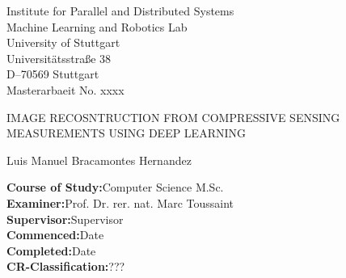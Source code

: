 \begin{titlepage}

\centering
\sffamily
%
\small
Institute for Parallel and Distributed Systems \\
Machine Learning and Robotics Lab\\
\null\vspace{0.5cm}
University of Stuttgart\\
Universitätsstraße 38\\
D–70569 Stuttgart\\

\null\vspace{1cm}
Masterarbaeit No. xxxx

\large
\null\vspace{1.5cm}
{\huge IMAGE RECOSNTRUCTION FROM COMPRESSIVE SENSING MEASUREMENTS USING DEEP LEARNING\\[12pt] 
} 
\null\vspace{0.2cm}

\small
Luis Manuel Bracamontes Hernandez

\raggedright
\null\vspace{1.5cm}
\textbf{Course of Study:}\null\hspace{0.1cm}Computer Science M.Sc.\\
\null\vspace{0.7cm}
\textbf{Examiner:}\null\hspace{0.1cm}Prof. Dr. rer. nat. Marc Toussaint\\
\null\vspace{0.01cm}
\textbf{Supervisor:}\null\hspace{0.1cm}Supervisor\\
\null\vspace{1cm}
\textbf{Commenced:}\null\hspace{0.1cm}Date\\
\null\vspace{0.01cm}
\textbf{Completed:}\null\hspace{0.1cm}Date\\
\null\vspace{1cm}
\textbf{CR-Classification:}\null\hspace{0.1cm}???\\


\vspace{2cm}
\end{titlepage}



